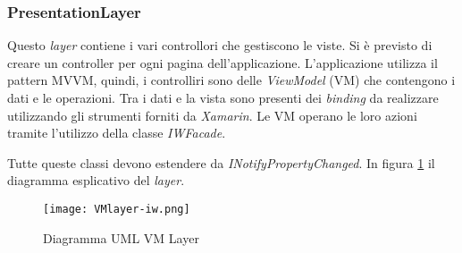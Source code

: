 \begin{namespacedesc}
\end{namespacedesc}



\subsubsection{PresentationLayer} %
Questo \emph{layer} contiene i vari controllori che gestiscono le viste. Si è previsto di creare un controller per ogni pagina dell’applicazione. L’applicazione utilizza il pattern MVVM, quindi, i controlliri sono delle \emph{ViewModel} (VM) che contengono i dati e le operazioni. Tra i dati e la vista sono presenti dei \emph{binding} da realizzare utilizzando gli strumenti forniti da \emph{Xamarin}. Le VM operano le loro azioni tramite l’utilizzo della classe \emph{IWFacade}. 


Tutte queste classi devono estendere da \emph{INotifyPropertyChanged}.
In figura \ref{fig:vm-layer-iw} il diagramma esplicativo del \emph{layer}.

\begin{figure}[htbp]
    \centering
    \texttt{[image: VMlayer-iw.png]} 
    \caption{Diagramma UML VM Layer}
    \label{fig:vm-layer-iw} 
\end{figure}

